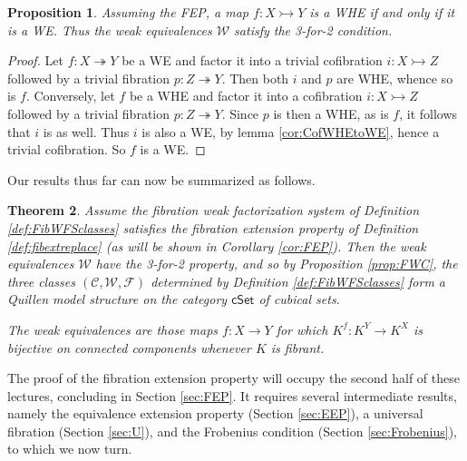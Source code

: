 \documentclass[12pt]{article}
\newcommand{\CC}{\ensuremath{\mathcal{C}}}
\newcommand{\WW}{\ensuremath{\mathcal{W}}}
\newcommand{\FF}{\ensuremath{\mathcal{F}}}
\newcommand{\cSet}{\ensuremath{\mathsf{cSet}}}
\newcommand{\mono}{\ensuremath{\rightarrowtail}}
\newcommand{\ra}{\ensuremath{\rightarrow}}
\renewcommand{\to}{\ensuremath{\rightarrow}}
\newcommand{\onto}{\ensuremath{\twoheadrightarrow}}
\newtheorem{theorem}{Theorem}
\newtheorem{proposition}[theorem]{Proposition}
\theoremstyle{remark}
\theoremstyle{definition}
\begin{document}
\begin{proposition}\label{prop:WHEiffWE}
Assuming the FEP, a map $ f : X \mono Y$ is a WHE if and only if it is a WE.  Thus the weak equivalences $\mathcal{W}$ satisfy the 3-for-2 condition.
\end{proposition}
\begin{proof}
Let $ f : X \onto Y$ be a WE and factor it into a trivial cofibration $i : X\mono Z$ followed by a trivial fibration $p: Z\onto Y$.  Then both 
$i$ and $p$ are WHE, whence so is $f$.  Conversely, let $f$ be a WHE and factor it into a cofibration $i : X\mono Z$ followed by a trivial fibration $p: Z\onto Y$. Since  $p$ is then a WHE, as is $f$, it follows that $i$ is as well.  Thus $i$ is also a WE, by lemma \ref{cor:CofWHEtoWE}, hence a trivial cofibration. So $f$ is a WE.
\end{proof}

Our results thus far can now be summarized as follows.

\begin{theorem}\label{theorem:QMSmodFEP}
Assume the fibration weak factorization system of Definition \ref{def:FibWFSclasses} satisfies the fibration extension property of Definition \ref{def:fibextreplace} (as will be shown in Corollary \ref{cor:FEP}). 
Then the weak equivalences $\WW$ have the 3-for-2 property, and so by Proposition \ref{prop:FWC}, the three classes $(\CC,\WW,\FF)$ determined by Definition \ref{def:FibWFSclasses} form a Quillen model structure on the category $\cSet$ of cubical sets.

The weak equivalences are those maps $f: X\ra Y$ for which $K^f : K^Y \to K^X$ is bijective on connected components whenever $K$ is fibrant.
\end{theorem}

%

The proof of the fibration extension property will occupy the second half of these lectures, concluding in Section  \ref{sec:FEP}.  It requires several intermediate results, namely the equivalence extension property (Section \ref{sec:EEP}), a universal fibration (Section \ref{sec:U}), and the Frobenius condition (Section \ref{sec:Frobenius}), to which we now turn.
\end{document}
